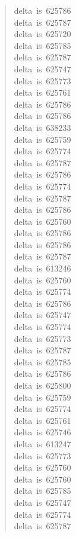 \documentclass[letterpaper]{article}
\begin{document}
\begin{quote}
{delta~is~625786\\
delta~is~625787\\
delta~is~625720\\
delta~is~625785\\
delta~is~625787\\
delta~is~625747\\
delta~is~625773\\
delta~is~625761\\
delta~is~625786\\
delta~is~625786\\
delta~is~638233\\
delta~is~625759\\
delta~is~625774\\
delta~is~625787\\
delta~is~625786\\
delta~is~625774\\
delta~is~625787\\
delta~is~625786\\
delta~is~625760\\
delta~is~625786\\
delta~is~625786\\
delta~is~625787\\
delta~is~613246\\
delta~is~625760\\
delta~is~625774\\
delta~is~625786\\
delta~is~625747\\
delta~is~625774\\
delta~is~625773\\
delta~is~625787\\
delta~is~625785\\
delta~is~625786\\
delta~is~625800\\
delta~is~625759\\
delta~is~625774\\
delta~is~625761\\
delta~is~625746\\
delta~is~613247\\
delta~is~625773\\
delta~is~625760\\
delta~is~625760\\
delta~is~625785\\
delta~is~625747\\
delta~is~625774\\
delta~is~625787\\
}
\end{quote}
\end{document}
